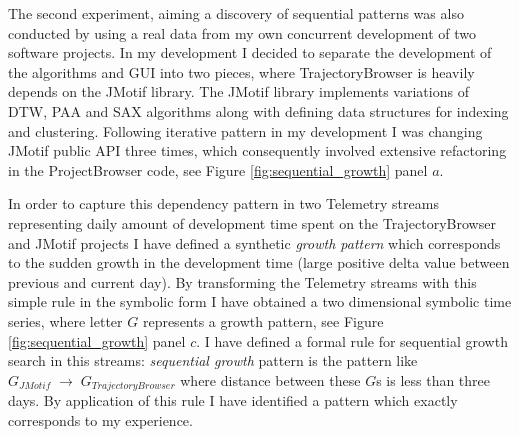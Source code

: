 The second experiment, aiming a discovery of sequential patterns was also conducted by using a real data from my own concurrent development of two software projects. In my development I decided to separate the development of the algorithms and GUI into two pieces, where TrajectoryBrowser is heavily depends on the JMotif library. The JMotif library implements variations of DTW, PAA and SAX algorithms along with defining data structures for indexing and clustering. Following iterative pattern in my development I was changing JMotif public API three times, which consequently involved extensive refactoring in the ProjectBrowser code, see Figure \ref{fig:sequential_growth} panel $a$.

In order to capture this dependency pattern in two Telemetry streams representing daily amount of development time spent on the TrajectoryBrowser and JMotif projects I have defined a synthetic \textit{growth pattern} which corresponds to the sudden growth in the development time (large positive delta value between previous and current day). By transforming the Telemetry streams with this simple rule in the symbolic form I have obtained a two dimensional symbolic time series, where letter $G$ represents a growth pattern, see Figure \ref{fig:sequential_growth} panel $c$. I have defined a formal rule for sequential growth search in this streams: \textit{sequential growth} pattern is the pattern like $G_{JMotif}\; \rightarrow \; G_{TrajectoryBrowser}$ where distance between these $G$s is less than three days. By application of this rule I have identified a pattern which exactly corresponds to my experience.
